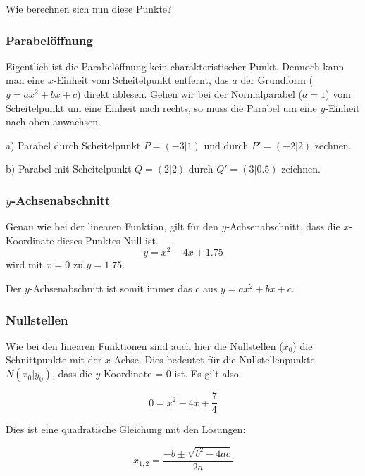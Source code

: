 Wie berechnen sich nun diese Punkte?
\newpage
\subsubsection{Parabelöffnung}
Eigentlich ist die Parabelöffnung kein charakteristischer
Punkt. Dennoch kann man eine $x$-Einheit vom Scheitelpunkt entfernt,
das $a$ der Grundform ($y=ax^2+bx+c$) direkt ablesen. Gehen wir bei
der Normalparabel ($a=1$) vom
Scheitelpunkt um eine Einheit nach rechts, so muss die Parabel um eine
$y$-Einheit nach oben anwachsen.

a) Parabel durch Scheitelpunkt $P=(-3|1)$ und durch $P'=(-2|2)$ zechnen. 


b) Parabel mit Scheitelpunkt $Q=(2|2)$ durch $Q'=(3|0.5)$ zeichnen.



\subsubsection{$y$-Achsenabschnitt}
Genau wie bei der linearen Funktion, gilt für den $y$-Achsenabschnitt,
dass die $x$-Koordinate dieses Punktes Null ist.
$$y = x^2 -4x + 1.75$$
wird mit $x=0$ zu
$y = 1.75$.

Der $y$-Achsenabschnitt ist somit immer das $c$ aus $y = ax^2 + bx +
c$.

\newpage

\subsubsection{Nullstellen}
Wie bei den linearen Funktionen sind auch hier die
Nullstellen ($x_0$) die Schnittpunkte mit der $x$-Achse. Dies bedeutet für die
Nullstellenpunkte $N(x_0 | y_0)$, dass die $y$-Koordinate = 0 ist. Es gilt
also

$$0 = x^2 - 4 x + \frac{7}{4} $$

Dies ist eine quadratische Gleichung mit den Lösungen:

$$x_{1,2} = \frac{-b \pm \sqrt{b^2-4ac}}{2a}$$ 


